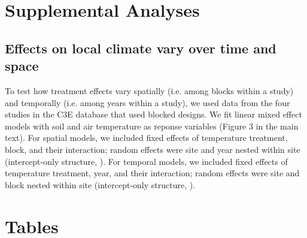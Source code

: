 \documentclass{article}
\begin{document}
\section* {Supplemental Analyses}
\subsection* {Effects on local climate vary over time and space}
To test how treatment effects vary spatially (i.e. among blocks within a study) and temporally (i.e. among years within a study), we used data from the four studies in the C3E database that used blocked designs. We fit linear mixed effect models with soil and air temperature as reponse variables (Figure 3 in the main text). For spatial models, we included fixed effects of temperature treatment, block, and their interaction; random effects were site and year nested within site (intercept-only structure, %
).  For temporal models, we included fixed effects of temperature treatment, year, and their interaction; random effects were site and block nested within site (intercept-only structure, %
). 



\clearpage

\section* {Tables}
\end{document}
